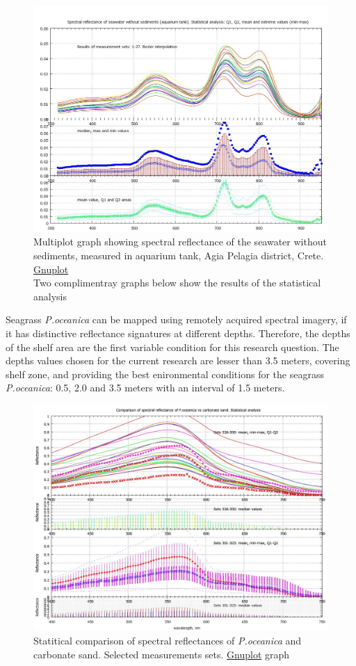\documentclass[10pt, a4paper]{article}
\begin{document}
\begin{figure}[H]
	\centering
	\includegraphics[scale=0.30]{GNU-21.jpg}
	\caption{Multiplot graph showing spectral reflectance of the seawater without sediments, measured in aquarium tank, Agia Pelagia district, Crete. \href{http://www.gnuplot.info/}{Gnuplot} \\Two complimentray graphs below show the results of the statistical analysis}
	\label{fig:27}
\end{figure}

Seagrass \textit{P.oceanica} can be mapped using remotely acquired spectral imagery, if it has distinctive
reflectance signatures at different depths. Therefore, the depths of the shelf area are the first variable
condition for this research question. The depths values chosen for the current research are lesser than
3.5 meters, covering shelf zone, and providing the best enironmental conditions for the seagrass
\textit{P.oceanica}: 0.5, 2.0 and 3.5 meters with an interval of 1.5 meters. 

\begin{figure}[H]
	\centering
	\includegraphics[scale=0.30]{GNU-20.jpg}
	\caption{Statitical comparison of spectral reflectances of \textit{P.oceanica} and carbonate sand. Selected measurements sets. \href{http://www.gnuplot.info/}{Gnuplot} graph}
	\label{fig:28}
\end{figure}
\end{document}
